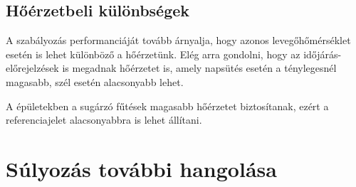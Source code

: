 \subsection{Hőérzetbeli különbségek}

A szabályozás performanciáját tovább árnyalja, hogy azonos levegőhőmérséklet esetén is lehet különböző a hőérzetünk. Elég arra gondolni, hogy az időjárás-előrejelzések is megadnak hőérzetet is, amely napsütés esetén a ténylegesnél magasabb, szél esetén alacsonyabb lehet.

A épületekben a sugárzó fűtések magasabb hőérzetet biztosítanak, ezért a referenciajelet alacsonyabbra is lehet állítani.

\section{Súlyozás további hangolása}


